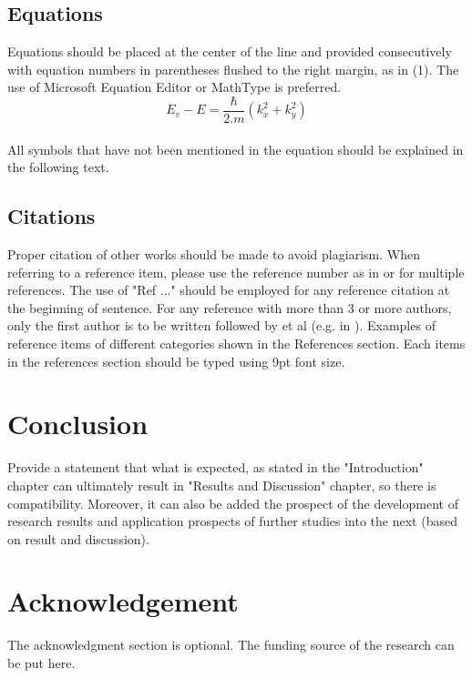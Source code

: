 \documentclass{iaesarticle3}
\begin{document}
\subsection{Equations}
Equations should be placed at the center of the line and provided consecutively with equation numbers in parentheses flushed to the right margin, as in (1). The use of Microsoft Equation Editor or MathType is preferred.
\\
\begin{equation}
E_v - E = \frac{\hbar}{2.m}(k_x^2 + k_y^2)
\end{equation}
\\
All symbols that have not been mentioned in the equation should be explained in the following text.

\subsection{Citations}
Proper citation of other works should be made to avoid plagiarism. When referring to a reference item, please use the reference number as in \cite{Li} or \cite{Li, Arulmozhiyal, Zhang, Yinhai, lamport, knuth} for multiple references. The use of "Ref \cite{lamport}..." should be employed for any reference citation at the beginning of sentence. For any reference with more than 3 or more authors, only the first author is to be written followed by et al (e.g. in \cite{Yinhai}).  Examples of reference items of different categories shown in the References section. Each items in the references section should be typed using 9pt font size.

\section{Conclusion}
\label{}
Provide a statement that what is expected, as stated in the "Introduction" chapter can ultimately result in "Results and Discussion" chapter, so there is compatibility. Moreover, it can also be added the prospect of the development of research results and application prospects of further studies into the next (based on result and discussion).

\section*{Acknowledgement}
\label{}
The acknowledgment section is optional. The funding source of the research can be put here.

\end{document}
